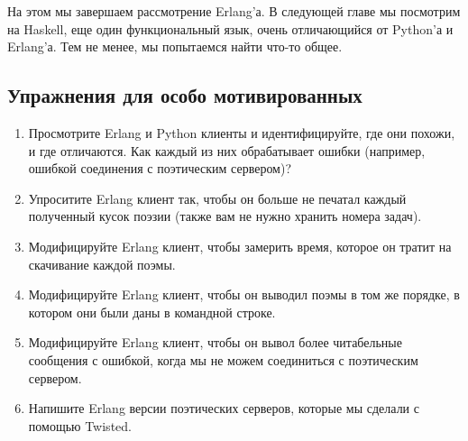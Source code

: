 На этом мы завершаем рассмотрение Erlang'а. В следующей главе мы 
посмотрим на Haskell, еще один функциональный язык, очень отличающийся 
от Python'а и Erlang'а. Тем не менее, мы попытаемся найти что-то общее.


\subsection{Упражнения для особо мотивированных}

\begin{enumerate}

\item Просмотрите Erlang и Python клиенты и идентифицируйте, где они 
похожи, и где отличаются. Как каждый из них обрабатывает ошибки (например, ошибкой 
соединения с поэтическим сервером)? 

\item Упроситите Erlang клиент так, чтобы он больше не 
печатал каждый полученный кусок поэзии (также вам не нужно хранить номера задач).

\item Модифицируйте Erlang клиент, чтобы замерить время, которое он 
тратит на скачивание каждой поэмы.

\item Модифицируйте Erlang клиент, чтобы он выводил поэмы в том же 
порядке, в котором они были даны в командной строке. 

\item Модифицируйте Erlang клиент, чтобы он вывол более читабельные 
сообщения с ошибкой, когда мы не можем соединиться с поэтическим сервером.

\item Напишите Erlang версии  поэтических серверов, которые мы сделали с помощью Twisted.

\end{enumerate}


